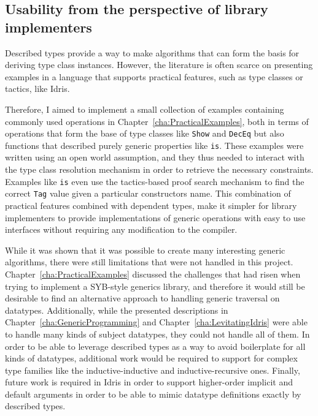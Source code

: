 \documentclass{ituthesis}
\newcommand{\tttype}[1]{\textcolor{type-color}{\texttt{#1}}}
\newcommand{\ttdec}[1]{\textcolor{declared-var-color}{\texttt{#1}}}
\theoremstyle{break}
\begin{document}
\subsection{Usability from the perspective of library implementers}
\label{sub:Usabilityfromtheperspectiveoflibraryimplementers}
Described types provide a way to make algorithms that can form the basis for deriving type class instances.
However, the literature is often scarce on presenting examples in a language that supports practical features, such as type classes or tactics, like Idris.

Therefore, I aimed to implement a small collection of examples containing commonly used operations in Chapter~\ref{cha:PracticalExamples}, both in terms of operations that form the base of type classes like \tttype{Show} and \tttype{DecEq} but also
functions that described purely generic properties like \ttdec{is}.
These examples were written using an open world assumption, and they thus needed to interact with the type class resolution mechanism in order to retrieve the necessary constraints.
Examples like \ttdec{is} even use the tactics-based proof search mechanism to find the correct \tttype{Tag} value given a particular constructors name.
This combination of practical features combined with dependent types, make it simpler for library implementers to provide implementations of generic operations with easy to use interfaces without requiring any modification to the compiler.

While it was shown that it was possible to create many interesting generic algorithms, there were still limitations that were not handled in this project.
Chapter~\ref{cha:PracticalExamples} discussed the challenges that had risen when trying to implement a SYB-style generics library, and therefore it would still be desirable to find an alternative approach to handling generic traversal on datatypes.
Additionally, while the presented descriptions in Chapter~\ref{cha:GenericProgramming} and Chapter~\ref{cha:LevitatingIdris} were able to handle many kinds of subject datatypes, they could not handle all of them.
In order to be able to leverage described types as a way to avoid boilerplate for all kinds of datatypes, additional work would be required to support for complex type families like the inductive-inductive and inductive-recursive ones.
Finally, future work is required in Idris in order to support higher-order implicit and default arguments in order to be able to mimic datatype definitions exactly by described types.
\end{document}
